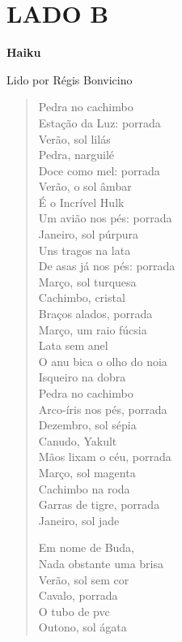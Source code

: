 \chapter*{LADO B}
\textbf{Haiku}\\
Lido por Régis Bonvicino

\begin{verse}
Pedra no cachimbo\\
Estação da Luz: porrada\\
Verão, sol lilás\\[5pt]
Pedra, narguilé\\
Doce como mel: porrada\\
Verão, o sol âmbar\\[5pt]
É o Incrível Hulk\\
Um avião nos pés: porrada\\
Janeiro, sol púrpura\\[5pt]
Uns tragos na lata\\
De asas já nos pés: porrada\\
Março, sol turquesa\\[5pt]
Cachimbo, cristal\\
Braços alados, porrada\\
Março, um raio fúcsia\\[5pt]
Lata sem anel\\
O anu bica o olho do noia\\
Isqueiro na dobra\\[5pt]
Pedra no cachimbo\\
Arco-íris nos pés, porrada\\
Dezembro, sol sépia\\[5pt]
Canudo, Yakult\\
Mãos lixam o céu, porrada\\
Março, sol magenta\\[5pt]
Cachimbo na roda\\
Garras de tigre, porrada\\
Janeiro, sol jade\\[5pt]

\pagebreak

Em nome de Buda,\\
Nada obstante uma brisa\\
Verão, sol sem cor\\[5pt]
Cavalo, porrada\\
O tubo de pvc\\
Outono, sol ágata
\end{verse}

